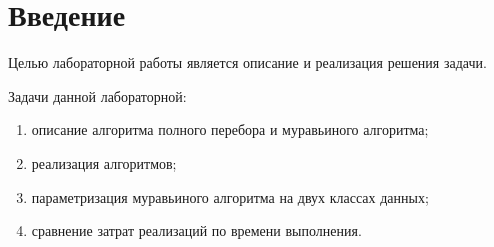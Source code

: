 \chapter*{Введение}


Целью лабораторной работы является описание и реализация решения задачи.

Задачи данной лабораторной:
\begin{enumerate}
	\item описание алгоритма полного перебора и муравьиного алгоритма;
	\item реализация алгоритмов;
	\item параметризация муравьиного алгоритма на двух классах данных;
	\item сравнение затрат реализаций по времени выполнения.
\end{enumerate}
